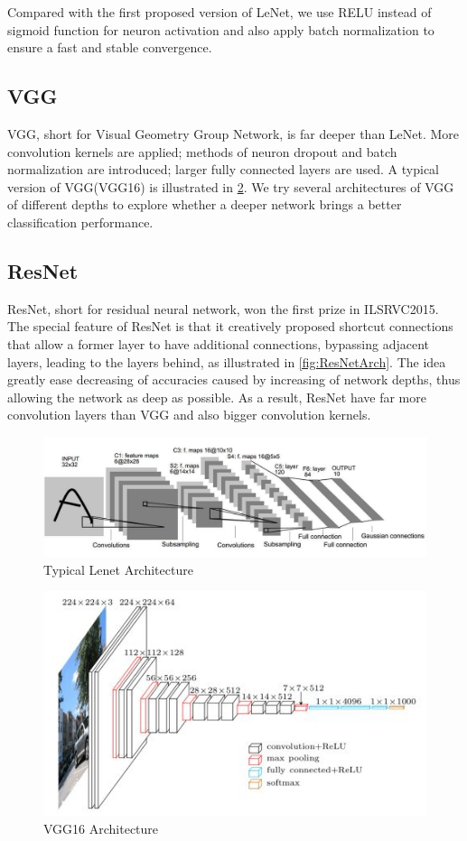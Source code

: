 \documentclass[journal, onecolumn]{IEEEtran}
\begin{document}
Compared with the first proposed version of LeNet, we use RELU instead of sigmoid function for neuron activation and also apply batch normalization to ensure a fast and stable convergence.

\subsection{VGG}
VGG, short for Visual Geometry Group Network, is far deeper than LeNet. More convolution kernels are applied; methods of neuron dropout and batch normalization are introduced; larger fully connected layers are used. A typical version of VGG(VGG16) is illustrated in \ref{fig:VGGArch}.
We try several architectures of VGG of different depths to explore whether a deeper network brings a better classification performance.

\subsection{ResNet}
ResNet, short for residual neural network, won the first prize in ILSRVC2015. The special feature of ResNet is that it creatively proposed shortcut connections that allow a former layer to have additional connections, bypassing adjacent layers, leading to the layers behind, as illustrated in \ref{fig:ResNetArch}. The idea greatly ease decreasing of accuracies caused by increasing of network depths, thus allowing the network as deep as possible. As a result, ResNet have far more convolution layers than VGG and also bigger convolution kernels.

\begin{figure}
  \centering
  \includegraphics[width=.45\textwidth]{LeNet_the.jpg}
  \caption{Typical Lenet Architecture}
  \label{fig:LeNetArch}
\end{figure}

\begin{figure}
  \centering
  \includegraphics[width=.45\textwidth]{VGG_the.jpg}
  \caption{VGG16 Architecture}
  \label{fig:VGGArch}
\end{figure}
\end{document}

